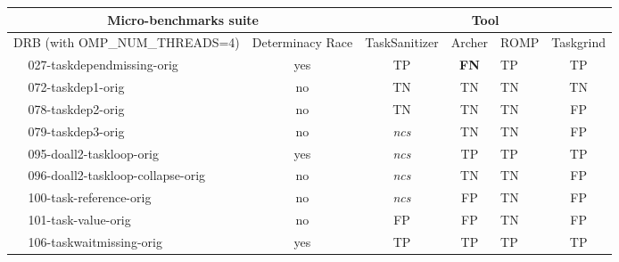 
\begin{table}[]
	\centering
	\small
	\begin{tabular}{llc|cclc}                                                                                                                                                     
		\multicolumn{3}{c|}{Micro-benchmarks suite}                                      & \multicolumn{4}{c}{Tool}                                                                    \\ \hline
		\multicolumn{2}{l}{DRB (with OMP\_NUM\_THREADS=4)}       & Determinacy Race      & TaskSanitizer        & Archer               & ROMP                 & Taskgrind              \\ \hline
		& 027-taskdependmissing-orig                             & yes                   & TP                   & \textbf{FN}          & TP                   & TP                     \\
		& 072-taskdep1-orig                                      & no                    & TN                   & TN                   & TN                   & TN                     \\
		& 078-taskdep2-orig                                      & no                    & TN                   & TN                   & TN                   & FP                     \\
		& 079-taskdep3-orig                                      & no                    & \emph{ncs}           & TN                   & TN                   & FP                     \\
		& 095-doall2-taskloop-orig                               & yes                   & \emph{ncs}           & TP                   & TP                   & TP                     \\
		& 096-doall2-taskloop-collapse-orig                      & no                    & \emph{ncs}           & TN                   & TN                   & FP                     \\
		& 100-task-reference-orig                                & no                    & \emph{ncs}           & FP                   & TN                   & FP                     \\
		& 101-task-value-orig                                    & no                    & FP                   & FP                   & TN                   & FP                     \\
		& 106-taskwaitmissing-orig                               & yes                   & TP                   & TP                   & TP                   & TP                     \\

\end{tabular}
\end{table}
